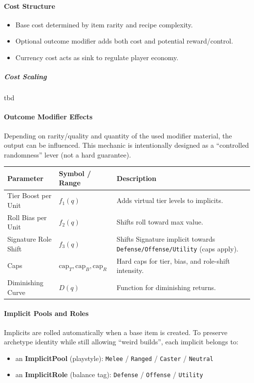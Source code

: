 \paragraph{Cost Structure}
\begin{itemize}
	\item Base cost determined by item rarity and recipe complexity.
	\item Optional outcome modifier adds both cost and potential reward/control.
	\item Currency cost acts as sink to regulate player economy.
\end{itemize}

\subparagraph{Cost Scaling}
tbd

\paragraph{Outcome Modifier Effects}
Depending on rarity/quality and quantity of the used modifier material, the output can be influenced.
This mechanic is intentionally designed as a ``controlled randomness'' lever (not a hard guarantee).

\begin{center}
	\begin{tabular}{|l|l|l|}
		\hline
		\textbf{Parameter} & \textbf{Symbol / Range} & \textbf{Description} \\ \hline
		Tier Boost per Unit & $f_1(q)$ & Adds virtual tier levels to implicits. \\
		Roll Bias per Unit & $f_2(q)$ & Shifts roll toward max value. \\
		Signature Role Shift & $f_3(q)$ & Shifts Signature implicit towards \texttt{Defense/Offense/Utility} (caps apply). \\
		Caps & $\text{cap}_T, \text{cap}_B, \text{cap}_R$ & Hard caps for tier, bias, and role-shift intensity. \\
		Diminishing Curve & $D(q)$ & Function for diminishing returns. \\ \hline
	\end{tabular}
\end{center}

\paragraph{Implicit Pools and Roles}
Implicits are rolled automatically when a base item is created. To preserve archetype identity while still allowing ``weird builds'',
each implicit belongs to:
\begin{itemize}
	\item an \textbf{ImplicitPool} (playstyle): \texttt{Melee} / \texttt{Ranged} / \texttt{Caster} / \texttt{Neutral}
	\item an \textbf{ImplicitRole} (balance tag): \texttt{Defense} / \texttt{Offense} / \texttt{Utility}
\end{itemize}

